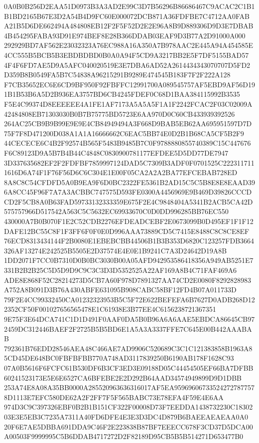 \documentclass[UTF8,fontset=fandol,zihao=-4,a4paper]{ctexart}
\begin{document}
{{0A0B0B256D2EAA51D0973B3A3AD2E99C3D7B56296B86686467C9ACAC2C1B1B1BD2165B67E3D2A54B4D9FC60E000072DCB871A36FDFBE7C4712AA0FAB
A21B5D6DE662494A484808EB12F2F5F52D2E2E96A8B9D889306D9D3E7DBAB4B454295FABA93D91E974BEF8E28B366DDAB03EAF9D3B77A2D91000A000
292929BD7AF562E23032323A76EC988A16A350A7B978AAC2E445A94A454585E4CC555B5BCB5B3EBDBDBD0B0A0A94F5CD9A3217BB2E5F7DF5155BAD57
4F4F6FD7AE5D9A5AFC040020519E3E7DBA6AD52A2614434343070707D5FD2D359B8B0549FA5B7C54838A96215291B9289E474545B183F7F2F222A128
F7CB35652EC6E6CD9BF950F92FBFFC12991700A089545757AF5EBD9AF56D191B1B53B6A5D2B936EA3757BD6CB4245FDEF0C68D1BAA384115992B3535
F5E4C99374D8EEEEEE4A1FE1AF7173A5A5A5F1A1F2242FCAC2F03C02009A42484808EB71303030B0B7B75775BD5723E6AA970D0C60CB433939392526
264AC25CB9B9B99E9E9E4CB84949494A3F668D9BAB5EB62AA695951597D7D75F7F8D471200D038A1A1A16666662C6EAC5BB74E0D2B1B68CA5CF5B2F9
44CECECE6C4B2F92574B565F5483B9485B7C0F9788880855740389C15C447676F6C89123D9A5B7B4B44C4848C0830900781177EFDEE5D5DD77DE7947
3D337635682EF2F2FDFBF7859997124DAD5C7309B3ADF0F0701525C2223117111616D6A74F1F76F56D6C6C304E1E00F05CA2A2A2BA77EFCEBAB728ED
8A8C8C54CFDFD5A0B9EA9F6D0BC2322FE5361B2AD15C5C5B8E8E8EAAD396A8CC45F96F7A7A3ACBBC747575D593FE0300A4456969E9B469D39826CCCD
CD2F5CB8A0B63FAD59733132333359E675F2E4C9848404A5341B2ACB5CA42D575757966D517542A563C5C5632EC69933670C0D0DD996285BB76EC550
430000A7B0B070F1E2C52CDB2276EFDEADCEBF2E0673099B0D495EF1F1F12DAFE12BC55C8F1F3FF6F0F0E0D996AAA73889CD5C7415E8488C8C8CE8EF
76ECD8313434144F2B0080E1EBEBCBB44506B1B3B353D6820C123257FDB3664326AF13274E242525B5505E2D37574E4E0E1B9241C7A3D24642D19A8B
1DD2071F7CC0B7310D0B0BC3030B00A05AFD942953586418356A949AB5251E7331B2B2B25C5D5D9D9C9C3C3D3D5352525A22AF169A8B4C71FAF469A6
ADE8E868F52C28214273D5CB7A60F978D7891327AA74CD2E0080F8292828983A752A8B091D3B76A430ABFE631095B908CABC58BF12FD4B07A011733D
79F2E4CC99332450CA01232323953B5C5F72E622BEFEFA6B7627D0ADB268D122352CF50F001027656565478E1C61938E3B77EE4C6156238721367351
9E75F3E64DCA741C1D1D491F0AAF0DA5B0B96A6A6AAE5EBDCA86645CB972459DC312446BAEF2F2725B5B5BD6E1A5A3A3337FFE7C645E00B442AAABAB
792361B76EDD28546AEA48C466AE7AD9906C520689C3C1C121383858B1963A85CD45DE648BC0FBFBFBB770A748AD3117839250B6190AB178F1628C93
07A0B5616F6FCFC61B530DF6B3CF3ED3E09188D05C44454505EF66BA7DFBB60241523173E5E6E6527CA6BFEBE2E2D292B64AAD34574949899D9D1DBB
253A74E8A08A35BB0000A285520963636316017AF5EA959696067335242727877578D1113E7EFC580DE62A2F2FF7F5F565BABC73E78EFA4F59E4E6AA
974D3C9C397326EBF0B2B1B151CF322F00008D73F7EEDDA1438732230C1830203E3E5EB3C7235A7311A40FD6DFE4E3E3D3DC4D879B6BAEEAEAEAA0A0
20F6E7AE5DBBA691DDA9C46F2E223838B87BF7EEECC678F3CD37D5DCA00A00503F9999995C5B6DDAB4717272D2F82189D95CB5B5B514271D653477B0
}}
\end{document}
